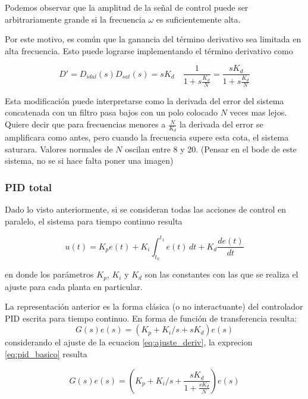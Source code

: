 \documentclass[10pt,conference,a4paper,onecolumn]{article}%
\begin{document}
Podemos observar que la amplitud de la señal de control puede ser arbitrariamente grande si la frecuencia $\omega$ es suficientemente alta.

Por este motivo, es común que la ganancia del término derivativo sea limitada en alta frecuencia. Esto puede lograrse implementando el término derivativo como


\begin{equation}
D'=D_{idal}(s)D_{sat}(s) =sK_d \quad  \frac{1}{1+s\frac{K_d}{N}} =    \frac{sK_d}{1+s\frac{K_d}{N}}
\label{eq:ajuste_deriv}
\end{equation}

Esta modificación puede interpretarse como la derivada del error del sistema concatenada con un filtro pasa bajos con un polo colocado $N$ veces mas lejos. Quiere decir que para frecuencias menores a $\frac{N}{K_d}$ la derivada del error se amplificara como antes, pero cuando la frecuencia supere esta cota, el sistema saturara. Valores normales de $N$ oscilan entre 8 y 20. (Pensar en el bode de este sistema, no se si hace falta poner una imagen)  

\subsubsection{PID total}

Dado lo visto anteriormente, si se consideran todas las acciones de control en paralelo, el sistema para tiempo continuo resulta

\begin{equation}
u(t)=K_pe(t)+K_i \int_{t_0}^{t_1} e(t) \,dt + K_d \frac{de(t)}{dt}
\end{equation}

en donde los parámetros $K_p$, $K_i$ y $K_d$ son las constantes con las que se realiza el ajuste para cada planta en particular. 

La representación anterior es la forma clásica (o no interactuante) del controlador PID escrita para tiempo continuo. En forma de función de transferencia resulta:
\begin{equation}
G(s)e(s)=\left(K_p + K_i/s + sK_d \right)e(s)
\label{eq:pid_basico}
\end{equation}
considerando el ajuste de la ecuacion \ref{eq:ajuste_deriv}, la exprecion \ref{eq:pid_basico} resulta

\begin{equation}
G(s)e(s)=\left( K_p + K_i/s + \frac{sK_d}{1+\frac{sK_d}{N} } \right)e(s)
\label{eq:pid_final}
\end{equation}
\end{document}

